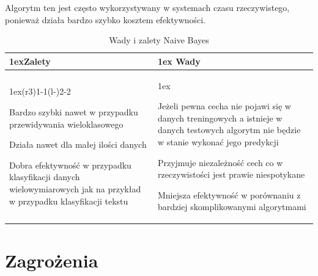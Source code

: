 Algorytm ten jest często wykorzystywany w systemach czasu rzeczywistego, ponieważ działa bardzo szybko 
kosztem efektywności.
\begin{table}[h]
    \begin{tabularx}{\linewidth}{>{\parskip1ex}X@{\kern4\tabcolsep}>{\parskip1ex}X}
    \toprule
    \hfil\bfseries Zalety
    &
    \hfil\bfseries Wady
    \\\cmidrule(r{3\tabcolsep}){1-1}\cmidrule(l{-\tabcolsep}){2-2}
    
    Bardzo szybki nawet w przypadku przewidywania wieloklasowego\par
    Działa nawet dla małej ilości danych\par
    Dobra efektywność w przypadku klasyfikacji danych wielowymiarowych
    jak na przykład w przypadku klasyfikacji tekstu\par
    
    &
    
    Jeżeli pewna cecha nie pojawi się w danych treningowych a istnieje w danych 
    testowych algorytm nie będzie w stanie wykonać jego predykcji\par
    Przyjmuje niezależność cech co w rzeczywistości jest prawie niespotykane\par
    Mniejsza efektywność w porównaniu z bardziej skomplikowanymi algorytmami\par
    
    \\\bottomrule
    \end{tabularx}
    \caption{Wady i zalety Naive Bayes}
\end{table}

\section{Zagrożenia}
